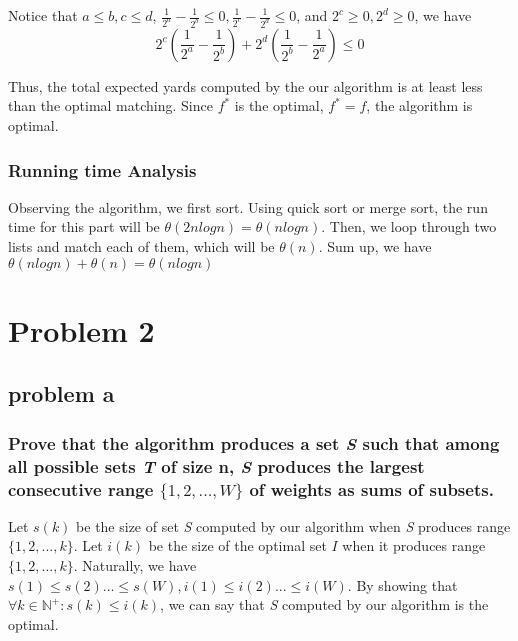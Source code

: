 \documentclass{article}
\begin{document}
        Notice that $a\leq b, c\leq d$, $\frac{1}{2^a}-\frac{1}{2^b} \leq 0, \frac{1}{2^c}-\frac{1}{2^d} \leq 0$, and $2^c \geq 0, 2^d\geq 0$, we have
        \[2^c(\frac{1}{2^a}-\frac{1}{2^b})+2^d(\frac{1}{2^b}-\frac{1}{2^a}) \leq 0\]

        Thus, the total expected yards computed by the our algorithm is at least less than the optimal matching. Since $f^*$ is the optimal, $f^* = f$, the algorithm is optimal.
        \\
        \subsubsection{Running time Analysis} 
        Observing the algorithm, we first sort. Using quick sort or merge sort, the run time for this part will be $\theta(2nlogn) = \theta(nlogn)$. Then, we loop through two lists and match each of them, which will be $\theta(n)$. Sum up, we have $\theta(nlogn)+\theta(n) = \theta(nlogn)$

\section{Problem 2}
    \subsection{problem a}
        \subsubsection{Prove that the algorithm produces a set \textit{S} such that among all possible sets \textit{T} of size n, \textit{S} produces the largest consecutive range $\{1, 2, . . . , W\}$ of weights as sums of subsets.}
        
        Let $s(k)$ be the size of set \textit{S} computed by our algorithm when \textit{S} produces range $\{1,2,...,k\}$. Let $i(k)$ be the size of the optimal set $I$ when it produces range $\{1,2,...,k\}$. Naturally, we have $s(1)\leq s(2)...\leq s(W), i(1)\leq i(2)...\leq i(W). $ By showing that $\forall k\in \mathbb{N}^{+}: s(k) \leq i(k)$, we can say that \textit{S} computed by our algorithm is the optimal.
        
\end{document}
